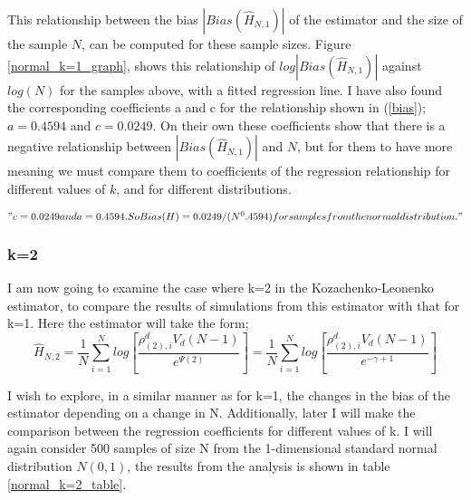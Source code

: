 \documentclass{article}
\begin{document}
This relationship between the bias $|Bias(\hat{H}_{N, 1})|$ of the estimator and the size of the sample $N$, can be computed for these sample sizes. Figure \ref{normal_k=1_graph}, shows this relationship of $log|Bias(\hat{H}_{N, 1})|$ against $log(N)$ for the samples above, with a fitted regression line. I have also found the corresponding coefficients a and c for the relationship shown in (\ref{bias}); $a = 0.4594$ and $c = 0.0249$. On their own these coefficients show that there is a negative relationship between $|Bias(\hat{H}_{N, 1})|$ and $N$, but for them to have more meaning we must compare them to coefficients of the regression relationship for different values of $k$, and for different distributions.




$"c = 0.0249 and a = 0.4594. So Bias(H) = 0.0249/(N^0.4594)  for samples from the normal distribution."$






\subsubsection{k=2} \label{N_k=2}

I am now going to examine the case where k=2 in the Kozachenko-Leonenko estimator, to compare the results of simulations from this estimator with that for k=1. Here the estimator will take the form;
\begin{equation}
\hat{H}_{N, 2} = \frac{1}{N} \sum_{i=1}^{N} log \left[ \frac{\rho_{(2),i}^{d} V_{d} (N-1)}{e^{\Psi(2)}} \right] = \frac{1}{N} \sum_{i=1}^{N} log \left[ \frac{\rho_{(2),i}^{d} V_{d} (N-1)}{e^{-\gamma + 1}} \right] \nonumber
\end{equation}

I wish to explore, in a similar manner as for k=1, the changes in the bias of the estimator depending on a change in N. Additionally, later I will make the comparison between the regression coefficients for different values of k. I will again consider 500 samples of size N from the 1-dimensional standard normal distribution $N(0, 1)$, the results from the analysis is shown in table \ref{normal_k=2_table}.
\end{document}
